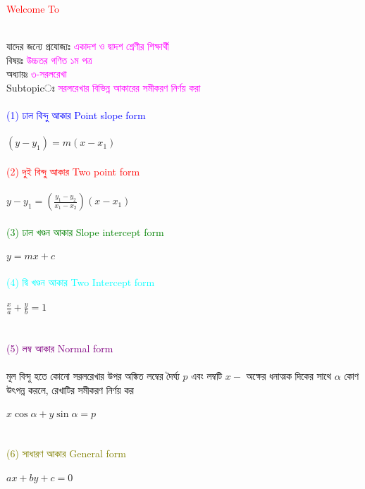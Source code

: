 \documentclass{article}
\begin{document}
 
	\Large
	\textcolor{red}{Welcome To} 
	\\
	\\
	যাদের জন্যে প্রযোজ্যঃ  	\textcolor{magenta}{একাদশ ও দ্বাদশ শ্রেণীর শিক্ষার্থী} \\
	বিষয়ঃ \textcolor{magenta}{উচ্চতর গণিত ১ম পত্র} \\
	অধ্যায়ঃ \textcolor{magenta}{৩-সরলরেখা}\\ 
	Subtopicঃ  \textcolor{magenta}{  সরলরেখার বিভিন্ন আকারের সমীকরণ নির্ণয় করা   }\\
	\\
	\textcolor{blue}{(1)	ঢাল বিন্দু আকার Point slope form}\\
	\\
	$(y-y_1)=m(x-x_1)$\\
	\\
	\textcolor{red} {(2)  দুই বিন্দু আকার 	Two point form}\\
	\\
	$y-y_1=\left(\frac{y_1-y_2}{x_1-x_2}\right)(x-x_1)$\\
	\\
	\textcolor{green}{ (3) ঢাল খণ্ডন আকার 	Slope intercept form}\\
	\\
	$y=mx+c$\\
	\\
	\textcolor{cyan}{ (4) দ্বি খণ্ডন আকার  Two	Intercept form}\\
	\\
	$\frac{x}{a}+\frac{y}{b}=1$\\
	\\
	\\
	\textcolor{purple}{ (5) লম্ব  আকার  Normal form}\\
	\\
	মূল বিন্দু হতে কোনো সরলরেখার উপর অঙ্কিত লম্বের দৈর্ঘ্য $p$ এবং লম্বটি $x-$ অক্ষের ধনাত্মক দিকের সাথে $\alpha$ কোণ উৎপন্ন করলে, রেখাটির সমীকরণ নির্ণয় কর \\ 
	\\
	$x\cos \alpha +y\sin \alpha=p$\\
	\\
	\\
	\textcolor{olive}{ (6) সাধারণ  আকার  General form}\\
	\\
	$ax+by+c=0$\\
	\\
\end{document}
